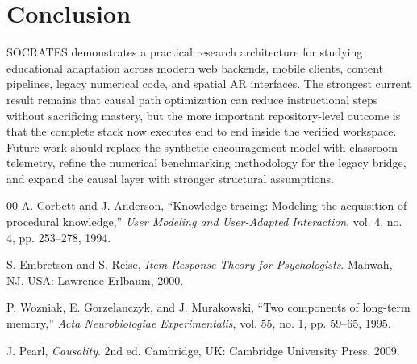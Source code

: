 \documentclass[conference]{IEEEtran}
\begin{document}
\section{Conclusion}
SOCRATES demonstrates a practical research architecture for studying educational adaptation across modern web backends, mobile clients, content pipelines, legacy numerical code, and spatial AR interfaces. The strongest current result remains that causal path optimization can reduce instructional steps without sacrificing mastery, but the more important repository-level outcome is that the complete stack now executes end to end inside the verified workspace. Future work should replace the synthetic encouragement model with classroom telemetry, refine the numerical benchmarking methodology for the legacy bridge, and expand the causal layer with stronger structural assumptions.

\begin{thebibliography}{00}
A. Corbett and J. Anderson, ``Knowledge tracing: Modeling the acquisition of procedural knowledge,'' \emph{User Modeling and User-Adapted Interaction}, vol. 4, no. 4, pp. 253--278, 1994.

S. Embretson and S. Reise, \emph{Item Response Theory for Psychologists}. Mahwah, NJ, USA: Lawrence Erlbaum, 2000.

P. Wozniak, E. Gorzelanczyk, and J. Murakowski, ``Two components of long-term memory,'' \emph{Acta Neurobiologiae Experimentalis}, vol. 55, no. 1, pp. 59--65, 1995.

J. Pearl, \emph{Causality}. 2nd ed. Cambridge, UK: Cambridge University Press, 2009.
\end{thebibliography}
\end{document}
